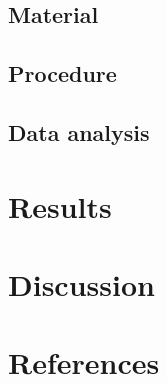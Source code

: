 \documentclass[
  man]{apa6}
\begin{document}
\hypertarget{material}{%
\subsection{Material}\label{material}}

\hypertarget{procedure}{%
\subsection{Procedure}\label{procedure}}

\hypertarget{data-analysis}{%
\subsection{Data analysis}\label{data-analysis}}

\hypertarget{results}{%
\section{Results}\label{results}}

\hypertarget{discussion}{%
\section{Discussion}\label{discussion}}

\hypertarget{references}{%
\section{References}\label{references}}
\end{document}
